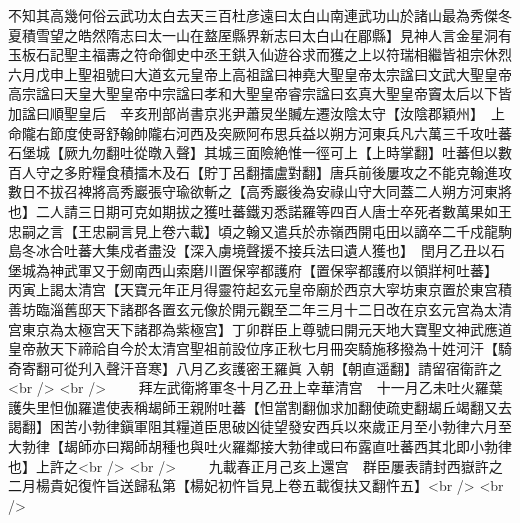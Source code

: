 不知其高幾何俗云武功太白去天三百杜彦遠曰太白山南連武功山於諸山最為秀傑冬夏積雪望之皓然隋志曰太一山在盩厔縣界新志曰太白山在郿縣】見神人言金星洞有玉板石記聖主福夀之符命御史中丞王鉷入仙遊谷求而獲之上以符瑞相繼皆祖宗休烈六月戊申上聖祖號曰大道玄元皇帝上高祖諡曰神堯大聖皇帝太宗諡曰文武大聖皇帝高宗諡曰天皇大聖皇帝中宗諡曰孝和大聖皇帝睿宗諡曰玄真大聖皇帝竇太后以下皆加諡曰順聖皇后　辛亥刑部尚書京兆尹蕭炅坐贓左遷汝陰太守【汝陰郡穎州】　上命隴右節度使哥舒翰帥隴右河西及突厥阿布思兵益以朔方河東兵凡六萬三千攻吐蕃石堡城【厥九勿翻吐從暾入聲】其城三面險絶惟一徑可上【上時掌翻】吐蕃但以數百人守之多貯糧食積擂木及石【貯丁呂翻擂盧對翻】唐兵前後屢攻之不能克翰進攻數日不拔召裨將高秀巖張守瑜欲斬之【高秀巖後為安祿山守大同蓋二人朔方河東將也】二人請三日期可克如期拔之獲吐蕃鐵刃悉諾羅等四百人唐士卒死者數萬果如王忠嗣之言【王忠嗣言見上卷六載】頃之翰又遣兵於赤嶺西開屯田以謫卒二千戍龍駒島冬冰合吐蕃大集戍者盡没【深入虜境聲援不接兵法曰遺人獲也】　閏月乙丑以石堡城為神武軍又于劒南西山索磨川置保寜都護府【置保寜都護府以領牂柯吐蕃】　丙寅上謁太清宫【天寶元年正月得靈符起玄元皇帝廟於西京大寜坊東京置於東宫積善坊臨淄舊邸天下諸郡各置玄元像於開元觀至二年三月十二日改在京玄元宫為太清宫東京為太極宫天下諸郡為紫極宫】丁卯群臣上尊號曰開元天地大寶聖文神武應道皇帝赦天下禘祫自今於太清宫聖祖前設位序正秋七月冊突騎施移撥為十姓河汗【騎奇寄翻可從刋入聲汗音寒】八月乙亥護密王羅眞入朝【朝直遥翻】請留宿衛許之<br />
<br />
　　拜左武衛將軍冬十月乙丑上幸華清宫　十一月乙未吐火羅葉護失里怛伽羅遣使表稱朅師王親附吐蕃【怛當割翻伽求加翻使疏吏翻朅丘竭翻又去謁翻】困苦小勃律鎭軍阻其糧道臣思破凶徒望發安西兵以來歲正月至小勃律六月至大勃律【朅師亦曰羯師胡種也與吐火羅鄰接大勃律或曰布露直吐蕃西其北即小勃律也】上許之<br />
<br />
　　九載春正月己亥上還宫　群臣屢表請封西嶽許之二月楊貴妃復忤旨送歸私第【楊妃初忤旨見上卷五載復扶又翻忤五】<br />
<br />
